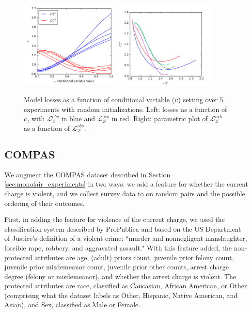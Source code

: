         \begin{figure}
            \centering
            \includegraphics[width=0.45\textwidth]{fig_softmono/synthetic_loss.png}
            \includegraphics[width=0.45\textwidth]{fig_softmono/synthetic_loss_tradeoff.png}
            \caption{
                Model losses as a function of conditional variable ($c$) setting over 5 experiments with random initializations.  Left: losses as a function of $c$, with $\mathcal{L}_Z^{obs}$ in blue and $\mathcal{L}_Z^{arb}$ in red.  Right: parametric plot of $\mathcal{L}_Z^{arb}$ as a function of $\mathcal{L}_Z^{obs}$.
            }
            \label{fig:sm_synthetic_losses}
        \end{figure}

    \subsection{COMPAS}\label{subsec:sm_compas}
    
        We augment the COMPAS dataset described in Section \ref{sec:monofair_experiments} in two ways: we add a feature for whether the current charge is violent, and we collect survey data to on random pairs and the possible ordering of their outcomes.
        
        First, in adding the feature for violence of the current charge, we used the classification system described by ProPublica \citep{larson2016we} and based on the US Department of Justice's definition of a violent crime: ``murder and nonnegligent manslaughter, forcible rape, robbery, and aggravated assault."  With this feature added, the non-protected attributes are age, (adult) priors count, juvenile prior felony count, juvenile prior misdemeanor count, juvenile prior other counts, arrest charge degree (felony or misdemeanor), and whether the arrest charge is violent.  The protected attributes are race, classified as Caucasian, African American, or Other (comprising what the dataset labels as Other, Hispanic, Native American, and Asian), and Sex, classified as Male or Female.
        
